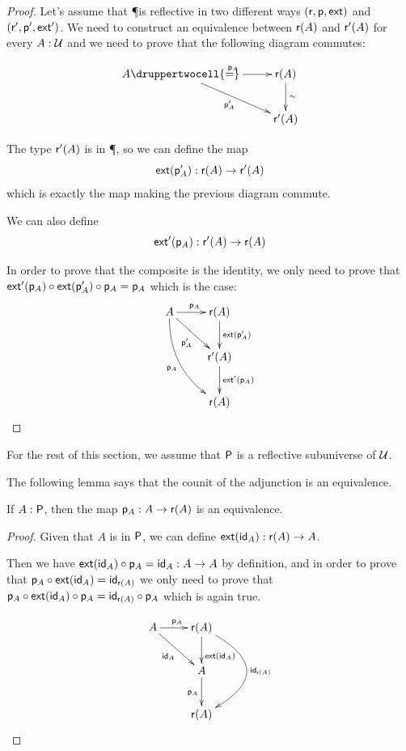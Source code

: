 \begin{proof}
  Let's assume that \P is reflective in two different ways
  $(\reflect,\project,\ext)$ and $(\reflect',\project',\ext')$. We need to
  construct an equivalence between $\reflect(A)$ and $\reflect'(A)$ for every
  $A:\type$ and we need to prove that the following diagram commutes:

  \[\uppercurveobject{{ }}\lowercurveobject{{ }}\twocellhead{{ }}
  \xymatrix{A \ar^{\project_A}[r] \ar_{\project'_A}[rd] \druppertwocell{=} &
    \reflect(A) \ar@{->}^\sim[d] \\
    & \reflect'(A)}\]

  The type $\reflect'(A)$ is in \P, so we can define the map
  \[\ext(\project'_A):\reflect(A)\to\reflect'(A)\]
  which is exactly the map making the previous diagram commute.

  We can also define
  \[\ext'(\project_A):\reflect'(A)\to\reflect(A)\]

  In order to prove that the composite is the identity, we only need to prove
  that $\ext'(\project_A)\circ\ext(\project'_A)\circ\project_A=\project_A$
  which is the case:
  \[\uppercurveobject{{ }}\lowercurveobject{{ }}\twocellhead{{ }}
  \xymatrix{A \ar^{\project_A}[r] \ar_{\project'_A}[rd]
    \ar@/_5mm/_{\project_A}[rdd] &
    \reflect(A) \ar@{->}^{\ext(\project'_A)}[d] \\
    & \reflect'(A) \ar@{->}^{\ext'(\project_A)}[d] \\
    & \reflect(A)}\]
\end{proof}

For the rest of this section, we assume that $\P$ is a reflective subuniverse of
$\type$.

The following lemma says that the counit of the adjunction is an equivalence.
\begin{lem}
  \label{reflectPequiv}
  If $A:\P$, then the map $\project_A:A\to\reflect(A)$ is an equivalence.
\end{lem}
\begin{proof}
  Given that $A$ is in $\P$, we can define $\ext(\idfunc[A]):\reflect(A)\to{}A$.

  Then we have $\ext(\idfunc[A])\circ\project_A=\idfunc[A]:A\to{}A$ by
  definition, and in order to prove that
  $\project_A\circ\ext(\idfunc[A])=\idfunc[\reflect(A)]$ we only need to prove
  that $\project_A\circ\ext(\idfunc[A])\circ\project_A=
  \idfunc[\reflect(A)]\circ\project_A$ which is again true.

  \[\xymatrix{
    A \ar^{\project_A}[r] \ar_{\idfunc[A]}[rd] &
    \reflect(A) \ar^>>>{\ext(\idfunc[A])}[d] \ar@/^40pt/^{\idfunc[\reflect(A)]}[dd] \\
    & A \ar_{\project_A}[d] \\
    & \reflect(A)}\]
\end{proof}


